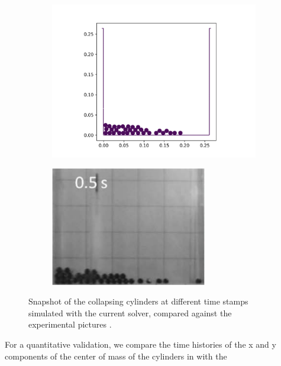 \begin{figure}[!htpb]
  \begin{subfigure}{0.48\textwidth}
    \centering
    \includegraphics[width=1.0\textwidth]{figures/rfc/figures/stack_of_cylinders_2d/Mohseni_Vyas/time3}
  \end{subfigure}
  \begin{subfigure}{0.48\textwidth}
    \centering
    \includegraphics[width=0.75\textwidth]{images/rfc/images/stack_of_cylinders_experimental_images/time3}
  \end{subfigure}
  \caption{Snapshot of the collapsing cylinders at different time stamps
    simulated with the current solver, compared against the experimental
    pictures \citep{zhang_simulation_2009}.}
\label{fig:snapshots-stack-of-cylinders}
\end{figure}
For a quantitative validation, we compare the time histories of the x and y
components of the center of mass of the cylinders in
 with the
